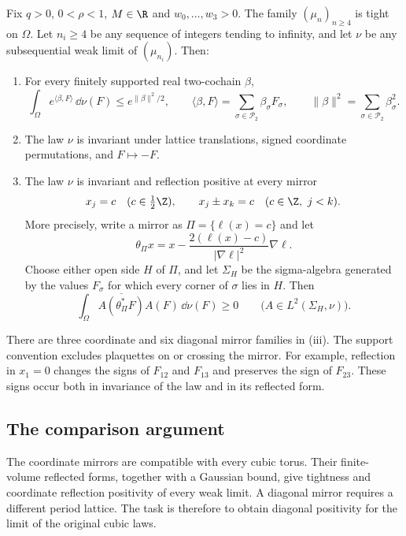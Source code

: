 \begin{theorem}\label{thm:main}\label{thm:cubic-limits}\label{thm:diag-lattice-limits}
Fix $q>0$, $0<\rho<1$, $M\in\R$ and $w_0,\ldots,w_3>0$.
The family $(\mu_n)_{n\ge4}$ is tight on $\Omega$. Let
$n_i\ge4$ be any sequence of integers tending to infinity, and let
$\nu$ be any subsequential weak limit of $(\mu_{n_i})$. Then:
\begin{enumerate}
\item[\textup{(i)}] For every finitely supported real two-cochain $\beta$,
\[
 \int_\Omega e^{\langle\beta,F\rangle}\,\dd\nu(F)
       \le e^{\|\beta\|^2/2},
 \qquad
 \langle\beta,F\rangle=\sum_{\sigma\in\mathcal P_2}\beta_\sigma F_\sigma,
 \qquad \|\beta\|^2=\sum_{\sigma\in\mathcal P_2}\beta_\sigma^2.
\]
\item[\textup{(ii)}] The law $\nu$ is invariant under lattice translations,
signed coordinate permutations, and $F\mapsto-F$.
\item[\textup{(iii)}] The law $\nu$ is invariant and reflection positive
at every mirror
\[
 x_j=c\quad(c\in\tfrac12\Z),\qquad
 x_j\pm x_k=c\quad(c\in\Z,\ j<k).
\]
More precisely, write a mirror as $\Pi=\{\ell(x)=c\}$ and let
\[
 \theta_\Pi x
 =x-\frac{2(\ell(x)-c)}{|\nabla\ell|^2}\nabla\ell.
\]
Choose either open side $H$ of $\Pi$, and let $\Sigma_H$ be the
sigma-algebra generated by the values $F_\sigma$ for which every
corner of $\sigma$ lies in $H$. Then
\[
 \int_\Omega\overline{A(\theta_\Pi^*F)}A(F)\,\dd\nu(F)\ge0
 \qquad\bigl(A\in L^2(\Sigma_H,\nu)\bigr).
\]
\end{enumerate}
\end{theorem}

There are three coordinate and six diagonal mirror families in
\textup{(iii)}. The support convention excludes plaquettes on or
crossing the mirror. For example, reflection in $x_1=0$ changes the
signs of $F_{12}$ and $F_{13}$ and preserves the sign of $F_{23}$.
These signs occur both in invariance of the law and in its reflected
form.

\subsection{The comparison argument}

The coordinate mirrors are compatible with every cubic torus. Their
finite-volume reflected forms, together with a Gaussian bound,
give tightness and coordinate reflection positivity of every weak
limit. A diagonal mirror requires a different period lattice.
The task is therefore to obtain diagonal positivity for the limit
of the original cubic laws.

